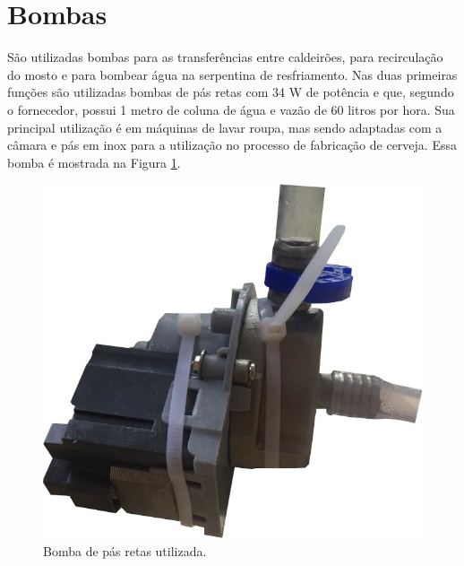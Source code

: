 		\section{Bombas}
São utilizadas bombas para as transferências entre caldeirões, para recirculação do mosto e para bombear água na serpentina de resfriamento. Nas duas primeiras funções são utilizadas bombas de pás retas com 34 W de potência e que, segundo o fornecedor, possui 1 metro de coluna de água e vazão de 60 litros por hora. Sua principal utilização é em máquinas de lavar roupa, mas sendo adaptadas com a câmara e pás em inox para a utilização no processo de fabricação de cerveja. Essa bomba é mostrada na Figura \ref{Bomba01}.
\begin{figure}[htb]
	\caption{\label{Bomba01}Bomba de pás retas utilizada.}
	\begin{center}
	    \includegraphics[width=0.45\linewidth]{./img/Bomba01.jpg}
	\end{center}
\end{figure}

